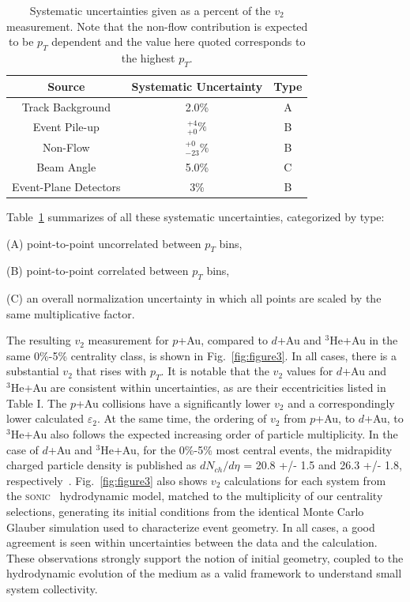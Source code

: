 \documentclass[%
reprint,
showpacs,preprintnumbers,
 amsmath,amssymb,
 aps,
]{revtex4-1}
\newcommand{\pt}{\mbox{$p_T$}\xspace}
\newcommand{\dau}{\mbox{$d$+Au}\xspace}
\newcommand{\pau}{\mbox{$p$+Au}\xspace}
\newcommand{\hau}{\mbox{$^3\text{He}$+Au}\xspace}
\begin{document}
\label{s:sys}
\begin{table}[htbp]
  \begin{center}
    \begin{tabular}{ccc}
      \hline
      \hline
      Source& Systematic Uncertainty & Type \\ \hline
      Track Background &2.0\%& A\\ 
      Event Pile-up    &$^{+4}_{+0}\%$& B\\
      Non-Flow    &$^{+0}_{-23}\%$& B\\
      Beam Angle &5.0\%& C\\  
      Event-Plane Detectors & 3\% & B\\
    \hline
    \hline
    \end{tabular}
   \caption{\label{t:sys}Systematic uncertainties given as a percent of the $v_2$ measurement. Note that the non-flow contribution is expected to be \pt dependent and the value here quoted corresponds to the highest \pt.}
   \end{center}
 \end{table}

Table~\ref{t:sys} summarizes of all these systematic
uncertainties, categorized by type:

(A) point-to-point uncorrelated between $p_T$ bins,

(B) point-to-point correlated between $p_T$ bins,

(C) an overall normalization uncertainty in which all points are scaled by the same multiplicative factor.

The resulting $v_2$ measurement for \pau, compared to \dau and \hau in the same 0\%-5\% centrality class, is shown in Fig.~\ref{fig:figure3}. In all cases, there is a substantial $v_2$ that rises with \pt. It is notable that the $v_2$ values for \dau and \hau are consistent within uncertainties, as are their eccentricities listed in Table I. The \pau collisions have a significantly lower $v_2$ and a correspondingly lower calculated $\varepsilon_2$. At the same time, the ordering of $v_2$ from \pau, to \dau, to \hau also follows the expected increasing order of particle multiplicity. In the case of \dau and \hau, for the 0\%-5\% most central events, the midrapidity charged particle density is published as $dN_{ch}/d\eta$ = 20.8 +/- 1.5 and 26.3 +/- 1.8, respectively~\cite{Adare:2015bua}. Fig.~\ref{fig:figure3} also shows $v_2$ calculations for each system from the \textsc{sonic}~\cite{Habich:2014jna} hydrodynamic model, matched to the multiplicity of our centrality selections, generating its initial conditions from the identical Monte Carlo Glauber simulation used to characterize event geometry. In all cases, a good agreement is seen within uncertainties between the data and the calculation. These observations strongly support the notion of initial geometry, coupled to the hydrodynamic evolution of the medium as a valid framework to understand small system collectivity.
\end{document}
